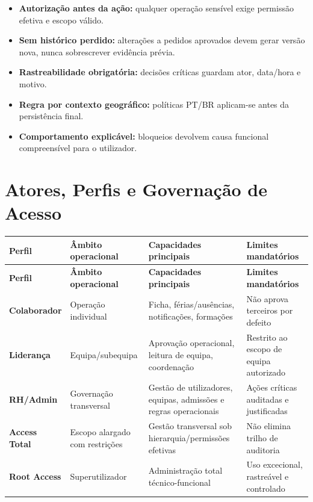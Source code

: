 \documentclass[11pt,a4paper,twoside]{article}
\newcommand{\tH}[1]{\textbf{\sffamily\small\color{white}#1}}
\newcommand{\theadrow}{\rowcolor{ACCENT}}
\begin{document}
\begin{itemize}
  \item \textbf{Autorização antes da ação:} qualquer operação sensível exige permissão efetiva e escopo válido.
  \item \textbf{Sem histórico perdido:} alterações a pedidos aprovados devem gerar versão nova, nunca sobrescrever evidência prévia.
  \item \textbf{Rastreabilidade obrigatória:} decisões críticas guardam ator, data/hora e motivo.
  \item \textbf{Regra por contexto geográfico:} políticas PT/BR aplicam-se antes da persistência final.
  \item \textbf{Comportamento explicável:} bloqueios devolvem causa funcional compreensível para o utilizador.
\end{itemize}

\section{Atores, Perfis e Governação de Acesso}

\begin{longtable}{>{\small\bfseries}p{2.2cm} >{\small}p{4.0cm} >{\small}p{3.7cm} >{\small}p{3.7cm}}
\theadrow
\tH{Perfil} & \tH{Âmbito operacional} & \tH{Capacidades principais} & \tH{Limites mandatórios} \\
\midrule
\endfirsthead
\theadrow
\tH{Perfil} & \tH{Âmbito operacional} & \tH{Capacidades principais} & \tH{Limites mandatórios} \\
\midrule
\endhead
Colaborador & Operação individual & Ficha, férias/ausências, notificações, formações & Não aprova terceiros por defeito \\
Liderança & Equipa/subequipa & Aprovação operacional, leitura de equipa, coordenação & Restrito ao escopo de equipa autorizado \\
RH/Admin & Governação transversal & Gestão de utilizadores, equipas, admissões e regras operacionais & Ações críticas auditadas e justificadas \\
Access Total & Escopo alargado com restrições & Gestão transversal sob hierarquia/permissões efetivas & Não elimina trilho de auditoria \\
Root Access & Superutilizador & Administração total técnico-funcional & Uso excecional, rastreável e controlado \\
\bottomrule
\end{longtable}
\end{document}
